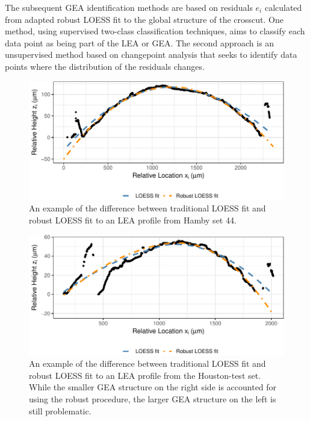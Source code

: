\documentclass[12pt]{article}
\begin{document}
The subsequent GEA identification methods are based on residuals \(e_i\)
calculated from adapted robust LOESS fit to the global structure of the
crosscut. One method, using supervised two-class classification
techniques, aims to classify each data point as being part of the LEA or
GEA. The second approach is an unsupervised method based on changepoint
analysis that seeks to identify data points where the distribution of
the residuals changes.

\begin{figure}
\centering
\includegraphics{writeup_files/figure-latex/loess-vs-locfit-1.pdf}
\caption{\label{loess-vs-locfit}An example of the difference between
traditional LOESS fit and robust LOESS fit to an LEA profile from Hamby
set 44.}
\end{figure}

\begin{figure}
\centering
\includegraphics{writeup_files/figure-latex/houston-locfit-1.pdf}
\caption{\label{houston-locfit}An example of the difference between
traditional LOESS fit and robust LOESS fit to an LEA profile from the
Houston-test set. While the smaller GEA structure on the right side is
accounted for using the robust procedure, the larger GEA structure on
the left is still problematic.}
\end{figure}
\end{document}
